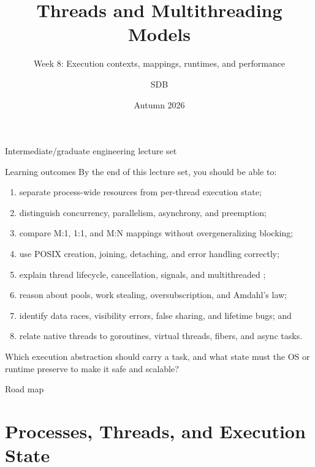 \documentclass[aspectratio=169,11pt]{beamer}
\title[Threads]{Threads and Multithreading Models}
\subtitle{Week 8: Execution contexts, mappings, runtimes, and performance}
\author[SDB]{SDB}
\date{Autumn 2026}
\newcommand{\code}[1]{\texttt{\detokenize{#1}}}
\begin{document}
\begin{frame}
  \titlepage
  \vspace{-1.2em}
  \begin{center}\small Intermediate/graduate engineering lecture set\end{center}
\end{frame}

\begin{frame}{Learning outcomes}
  By the end of this lecture set, you should be able to:
  \begin{enumerate}
    \item separate process-wide resources from per-thread execution state;
    \item distinguish concurrency, parallelism, asynchrony, and preemption;
    \item compare M:1, 1:1, and M:N mappings without overgeneralizing blocking;
    \item use POSIX creation, joining, detaching, and error handling correctly;
    \item explain thread lifecycle, cancellation, signals, and multithreaded \code{fork()};
    \item reason about pools, work stealing, oversubscription, and Amdahl's law;
    \item identify data races, visibility errors, false sharing, and lifetime bugs; and
    \item relate native threads to goroutines, virtual threads, fibers, and async tasks.
  \end{enumerate}
  \begin{tcolorbox}[title=Guiding question,colback=osorange!5,colframe=osorange!70]
    Which execution abstraction should carry a task, and what state must the OS or runtime preserve to make it safe and scalable?
  \end{tcolorbox}
\end{frame}

\begin{frame}{Road map}
  \tableofcontents
\end{frame}

\section{Processes, Threads, and Execution State}

\end{document}
